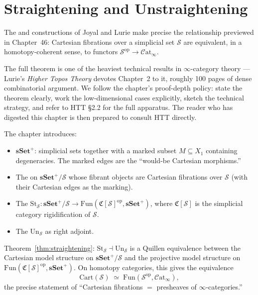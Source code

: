 
\chapter{Straightening and Unstraightening}

\begin{overviewbox}
The  and  constructions of Joyal
and Lurie make precise the relationship previewed in Chapter~46: Cartesian
fibrations over a simplicial set $\mathcal{S}$ are equivalent, in a
homotopy-coherent sense, to functors $\mathcal{S}^{\mathrm{op}} \to
\mathcal{C}\mathrm{at}_\infty$.

The full theorem is one of the heaviest technical results in $\infty$-category
theory — Lurie's \emph{Higher Topos Theory} devotes Chapter~2 to it,
roughly 100 pages of dense combinatorial argument. We follow the chapter's
proof-depth policy: state the theorem clearly, work the low-dimensional
cases explicitly, sketch the technical strategy, and refer to HTT §2.2
for the full apparatus. The reader who has digested this chapter is then
prepared to consult HTT directly.

The chapter introduces:
\begin{itemize}
  \item {} $\mathbf{sSet}^+$: simplicial sets
        together with a marked subset $M \subseteq X_1$ containing
        degeneracies. The marked edges are the ``would-be Cartesian
        morphisms.''
  \item The  on $\mathbf{sSet}^+\!/\mathcal{S}$
        whose fibrant objects are Cartesian fibrations over $\mathcal{S}$
        (with their Cartesian edges as the marking).
  \item The  $\mathrm{St}_\mathcal{S} :
        \mathbf{sSet}^+\!/\mathcal{S} \to \mathrm{Fun}(\mathfrak{C}[\mathcal{S}]^{\mathrm{op}},
        \mathbf{sSet}^+)$, where $\mathfrak{C}[\mathcal{S}]$ is the
        simplicial category rigidification of $\mathcal{S}$.
  \item The  $\mathrm{Un}_\mathcal{S}$ as right adjoint.
\end{itemize}

Theorem~\ref{thm:straightening}: $\mathrm{St}_\mathcal{S} \dashv \mathrm{Un}_\mathcal{S}$
is a Quillen equivalence between the Cartesian model structure on
$\mathbf{sSet}^+\!/\mathcal{S}$ and the projective model structure on
$\mathrm{Fun}(\mathfrak{C}[\mathcal{S}]^{\mathrm{op}}, \mathbf{sSet}^+)$.
On homotopy categories, this gives the equivalence
\begin{equation*}
  \mathrm{Cart}(\mathcal{S}) \;\simeq\; \mathrm{Fun}(\mathcal{S}^{\mathrm{op}}, \mathcal{C}\mathrm{at}_\infty),
\end{equation*}
the precise statement of ``Cartesian fibrations $=$ presheaves of
$\infty$-categories.''
\end{overviewbox}



